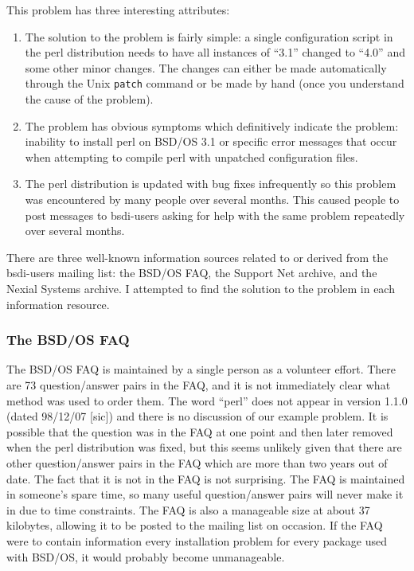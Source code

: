This problem has three interesting attributes:
\begin{enumerate}
\item The solution to the problem is fairly simple: a single configuration
  script in the perl distribution needs to have all instances of ``3.1''
  changed to ``4.0'' and some other minor changes. The changes can either be
  made automatically through the Unix {\tt patch} command or be made by hand
  (once you understand the cause of the problem).
\item The problem has obvious symptoms which definitively indicate the problem:
  inability to install perl on BSD/OS 3.1 or specific error messages that occur
  when attempting to compile perl with unpatched configuration files.
\item The perl distribution is updated with bug fixes infrequently so this
  problem was encountered by many people over several months. This caused
  people to post messages to bsdi-users asking for help with the same problem
  repeatedly over several months.
\end{enumerate}

There are three well-known information sources related to or derived from the
bsdi-users mailing list: the BSD/OS FAQ, the Support Net archive, and the
Nexial Systems archive. I attempted to find the solution to the problem in
each information resource.

\subsubsection{The BSD/OS FAQ}
The BSD/OS FAQ \cite{bsdi-FAQ} is maintained by a single person as a volunteer
effort. There are 73 question/answer pairs in the FAQ, and it is not
immediately clear what method was used to order them. The word ``perl'' does
not appear in version 1.1.0 (dated 98/12/07 [sic]) and there is no discussion
of our example problem. It is possible that the question was in the FAQ at one
point and then later removed when the perl distribution was fixed, but this
seems unlikely given that there are other question/answer pairs in the FAQ
which are more than two years out of date. The fact that it is not in the FAQ
is not surprising. The FAQ is maintained in someone's spare time, so many
useful question/answer pairs will never make it in due to time constraints. The
FAQ is also a manageable size at about 37 kilobytes, allowing it to be posted
to the mailing list on occasion. If the FAQ were to contain information every
installation problem for every package used with BSD/OS, it would probably
become unmanageable.

